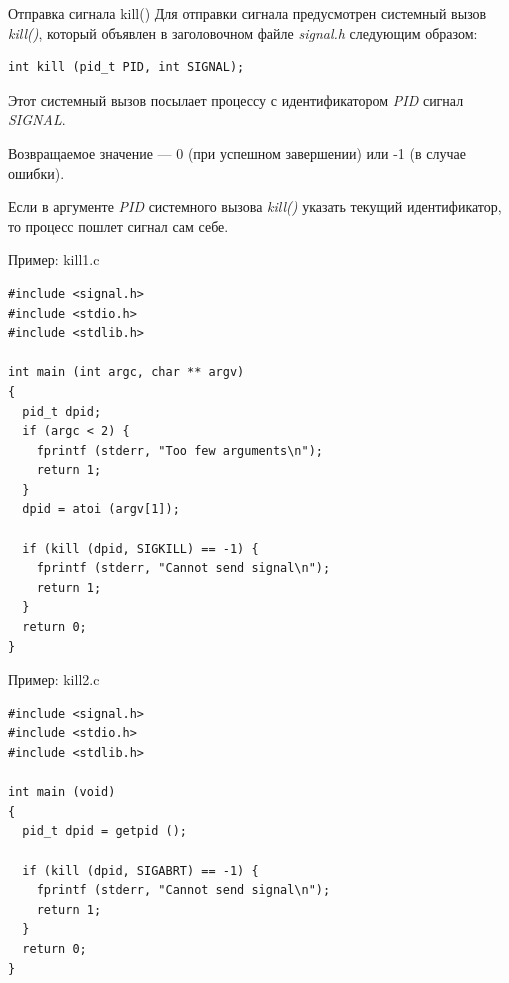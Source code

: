 \documentclass[xcolor=table]{beamer}
\begin{document}
\begin{frame}[fragile]{Отправка сигнала kill()}
	Для отправки сигнала предусмотрен системный вызов \textit{kill()}, который объявлен в заголовочном файле \textit{signal.h} следующим образом:
	\begin{verbatim}
int kill (pid_t PID, int SIGNAL);
	\end{verbatim}
	Этот системный вызов посылает процессу с идентификатором \textit{PID} сигнал \textit{SIGNAL}.

	\medskip
	Возвращаемое значение --- 0 (при успешном завершении) или -1 (в случае ошибки).

	\medskip
	Если в аргументе \textit{PID} системного вызова \textit{kill()} указать текущий идентификатор, то процесс пошлет сигнал сам себе. 
\end{frame}

\begin{frame}[fragile]{Пример: kill1.c}
	\linespread{0.8}
	\begin{verbatim}
#include <signal.h>
#include <stdio.h>
#include <stdlib.h>

int main (int argc, char ** argv)
{
  pid_t dpid;
  if (argc < 2) {
    fprintf (stderr, "Too few arguments\n");
    return 1;
  }
  dpid = atoi (argv[1]);
  
  if (kill (dpid, SIGKILL) == -1) {
    fprintf (stderr, "Cannot send signal\n");
    return 1;
  }	
  return 0;
}
	\end{verbatim}
\end{frame}

\begin{frame}[fragile]{Пример: kill2.c}
	\linespread{0.8}
	\begin{verbatim}
#include <signal.h>
#include <stdio.h>
#include <stdlib.h>

int main (void)
{
  pid_t dpid = getpid ();

  if (kill (dpid, SIGABRT) == -1) {
    fprintf (stderr, "Cannot send signal\n");
    return 1;
  }
  return 0;
}
	\end{verbatim}
\end{frame}
\end{document}
